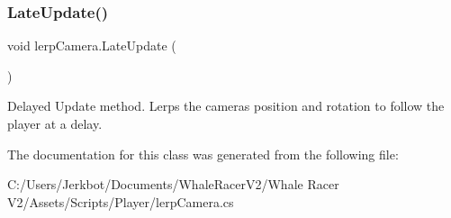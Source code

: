 \subsubsection{\texorpdfstring{Late\+Update()}{LateUpdate()}}
{\footnotesize\ttfamily void lerp\+Camera.\+Late\+Update (\begin{DoxyParamCaption}{ }\end{DoxyParamCaption})\hspace{0.3cm}{\ttfamily [private]}}



Delayed Update method. Lerps the camera\textquotesingle{}s position and rotation to follow the player at a delay. 



The documentation for this class was generated from the following file\+:\begin{DoxyCompactItemize}
\item 
C\+:/\+Users/\+Jerkbot/\+Documents/\+Whale\+Racer\+V2/\+Whale Racer V2/\+Assets/\+Scripts/\+Player/lerp\+Camera.\+cs\end{DoxyCompactItemize}
